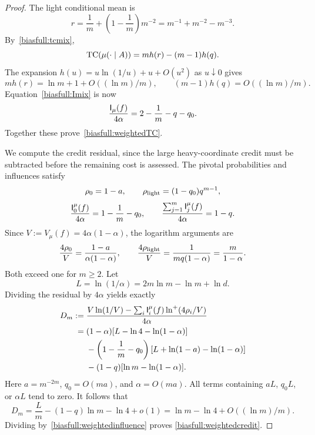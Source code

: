 \begin{proof}
The light conditional mean is
\[
 r=\frac1m+\left(1-\frac1m\right)m^{-2}
     =m^{-1}+m^{-2}-m^{-3}.
\]
By~\eqref{biasfull:tcmix},
\[
 \operatorname{TC}(\mu(\cdot\mid A))=mh(r)-(m-1)h(q).
\]
The expansion
\(h(u)=u\ln(1/u)+u+O(u^2)\) as \(u\downarrow0\) gives
\[
 mh(r)=\ln m+1+O((\ln m)/m),\qquad
 (m-1)h(q)=O((\ln m)/m).
\]
Equation~\eqref{biasfull:Imix} is now
\begin{equation}\label{biasfull:weightedinfluence}
 \frac{\mathsf I_\mu(f)}{4\alpha}
      =2-\frac1m-q-q_0.
\end{equation}
Together these prove~\eqref{biasfull:weightedTC}.

We compute the credit residual, since the large heavy-coordinate
credit must be subtracted before the remaining cost is assessed.
The pivotal probabilities and influences satisfy
\[
 \rho_0=1-a,\qquad
 \rho_{\rm light}=(1-q_0)q^{m-1},
\]
\[
 \frac{\mathsf I_0^\mu(f)}{4\alpha}=1-\frac1m-q_0,\qquad
 \frac{\sum_{j=1}^m\mathsf I_j^\mu(f)}{4\alpha}=1-q.
\]
Since \(V:=V_\mu(f)=4\alpha(1-\alpha)\), the logarithm arguments are
\begin{equation}\label{biasfull:weightcreditargs}
 \frac{4\rho_0}{V}=\frac{1-a}{\alpha(1-\alpha)},\qquad
 \frac{4\rho_{\rm light}}{V}
      =\frac{1}{mq(1-\alpha)}=\frac{m}{1-\alpha}.
\end{equation}
Both exceed one for \(m\ge2\). Let
\[
 L=\ln(1/\alpha)=2m\ln m-\ln m+\ln d.
\]
Dividing the residual by \(4\alpha\) yields exactly
\begin{align}
 D_m:={}&\frac{V\ln(1/V)-\sum_i\mathsf I_i^\mu(f)\ln^+(4\rho_i/V)}
                    {4\alpha}\notag\\
 ={}&(1-\alpha)[L-\ln4-\ln(1-\alpha)]\notag\\
 &-\left(1-\frac1m-q_0\right)
                 [L+\ln(1-a)-\ln(1-\alpha)]\notag\\
 &-(1-q)[\ln m-\ln(1-\alpha)].
                       \label{biasfull:residualexact}
\end{align}
Here \(a=m^{-2m}\), \(q_0=O(ma)\), and \(\alpha=O(ma)\).
All terms containing \(aL\), \(q_0L\), or \(\alpha L\) tend to zero.
It follows that
\[
 D_m=\frac Lm-(1-q)\ln m-\ln4+o(1)
      =\ln m-\ln4+O((\ln m)/m).
\]
Dividing by~\eqref{biasfull:weightedinfluence} proves
\eqref{biasfull:weightedcredit}.


\end{proof}
